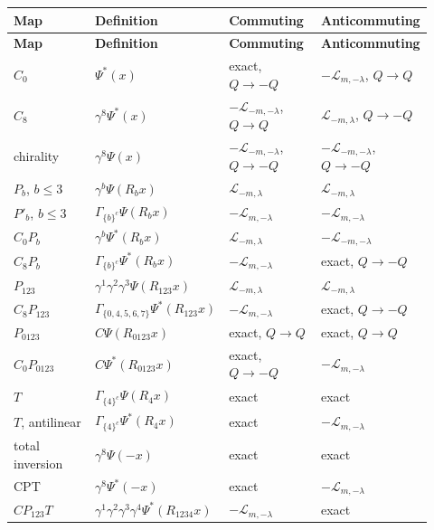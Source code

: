 \documentclass[11pt]{article}
\begin{document}
\begin{longtable}{@{}p{0.230\linewidth}p{0.230\linewidth}p{0.230\linewidth}p{0.230\linewidth}@{}}
\toprule
\textbf{Map} & \textbf{Definition} & \textbf{Commuting} & \textbf{Anticommuting} \\
\midrule
\endfirsthead
\toprule
\textbf{Map} & \textbf{Definition} & \textbf{Commuting} & \textbf{Anticommuting} \\
\midrule
\endhead
$C_0$ & $\Psi^\ast(x)$ & exact, $Q\to-Q$ & $-\mathcal L_{m,-\lambda}$, $Q\to Q$ \\
$C_8$ & $\gamma^8\Psi^\ast(x)$ & $-\mathcal L_{-m,-\lambda}$, $Q\to Q$ & $\mathcal L_{-m,\lambda}$, $Q\to-Q$ \\
chirality & $\gamma^8\Psi(x)$ & $-\mathcal L_{-m,-\lambda}$, $Q\to-Q$ & $-\mathcal L_{-m,-\lambda}$, $Q\to-Q$ \\
$P_b$, $b\le3$ & $\gamma^b\Psi(R_bx)$ & $\mathcal L_{-m,\lambda}$ & $\mathcal L_{-m,\lambda}$ \\
$P'_b$, $b\le3$ & $\Gamma_{\{b\}^c}\Psi(R_bx)$ & $-\mathcal L_{m,-\lambda}$ & $-\mathcal L_{m,-\lambda}$ \\
$C_0P_b$ & $\gamma^b\Psi^\ast(R_bx)$ & $\mathcal L_{-m,\lambda}$ & $-\mathcal L_{-m,-\lambda}$ \\
$C_8P_b$ & $\Gamma_{\{b\}^c}\Psi^\ast(R_bx)$ & $-\mathcal L_{m,-\lambda}$ & exact, $Q\to-Q$ \\
$P_{123}$ & $\gamma^1\gamma^2\gamma^3\Psi(R_{123}x)$ & $\mathcal L_{-m,\lambda}$ & $\mathcal L_{-m,\lambda}$ \\
$C_8P_{123}$ & $\Gamma_{\{0,4,5,6,7\}}\Psi^\ast(R_{123}x)$ & $-\mathcal L_{m,-\lambda}$ & exact, $Q\to-Q$ \\
$P_{0123}$ & $C\Psi(R_{0123}x)$ & exact, $Q\to Q$ & exact, $Q\to Q$ \\
$C_0P_{0123}$ & $C\Psi^\ast(R_{0123}x)$ & exact, $Q\to-Q$ & $-\mathcal L_{m,-\lambda}$ \\
$T$ & $\Gamma_{\{4\}^c}\Psi(R_4x)$ & exact & exact \\
$T$, antilinear & $\Gamma_{\{4\}^c}\Psi^\ast(R_4x)$ & exact & $-\mathcal L_{m,-\lambda}$ \\
total inversion & $\gamma^8\Psi(-x)$ & exact & exact \\
CPT & $\gamma^8\Psi^\ast(-x)$ & exact & $-\mathcal L_{m,-\lambda}$ \\
$CP_{123}T$ & $\gamma^1\gamma^2\gamma^3\gamma^4\Psi^\ast(R_{1234}x)$ & $-\mathcal L_{m,-\lambda}$ & exact \\
\bottomrule
\end{longtable}
\end{document}
